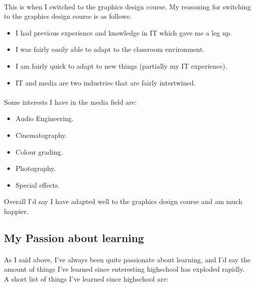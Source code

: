 \paragraph{}
This is when I switched to the graphics design course. My reasoning for
switching to the graphics design course is as follows:

\begin{itemize}
	\item {I had previous experience and knowledge in IT which gave me a leg up.}
	\item {I was fairly easily able to adapt to the classroom environment.}
	\item {I am fairly quick to adapt to new things (partially my IT experience).}
	\item {IT and media are two industries that are fairly intertwined.}
\end{itemize}

\paragraph{}

Some interests I have in the media field are:

\begin{itemize}
	\item {Audio Engineering.}
	\item {Cinematography.}
	\item {Colour grading.}
	\item {Photography.}
	\item {Special effects.}
\end{itemize}

Overall I'd say I have adapted well to the graphics design course and am much happier.

\subsection{My Passion about learning}

\paragraph{}
As I said above, I've always been quite passionate about learning, and I'd say
the amount of things I've learned since enteresting highschool has exploded
rapidly. A short list of things I've learned since highschool are:


